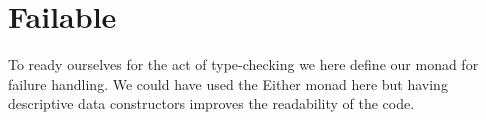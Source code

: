 \section{Failable}




To ready ourselves for the act of type-checking we here define our monad for
failure handling. We could have used the Either monad here but having descriptive
data constructors improves the readability of the code.

